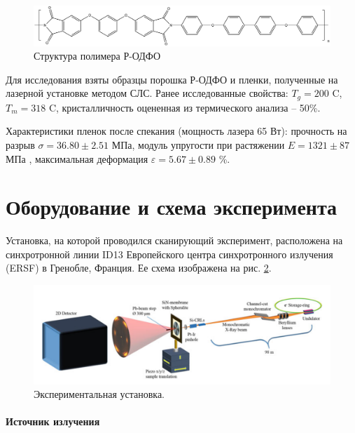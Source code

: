		
	\begin{figure}[h]
	\includegraphics[width=\textwidth]{fig/formula.png}
	\caption{Структура полимера Р-ОДФО \cite{pi-formula}}
	\label{fig:formula}
	\end{figure}

Для исследования взяты образцы порошка Р-ОДФО и пленки, полученные на лазерной установке методом СЛС. Ранее исследованные свойства\cite{vaganov}:
 $T_g = 200$ \textdegree C, $T_m = 318$ \textdegree C, кристалличность оцененная из термического анализа -- 50\%.

Характеристики пленок после спекания (мощность лазера 65 Вт):
прочность на разрыв $ \sigma =36.80 \pm 2.51$ МПа, модуль упругости при растяжении   $ E = 1321 \pm 87$ МПа , максимальная деформация $ \varepsilon = 5.67  \pm 0.89$ \%. 


\section{Оборудование и схема эксперимента}
Установка, на которой проводился сканирующий эксперимент, расположена на синхротронной линии ID13 Европейского центра синхротронного излучения (ERSF) в Гренобле, Франция. Ее схема  изображена на рис. \ref{fig:experiment}. 

\begin{figure}[h]
    \centering
    \includegraphics[width=\linewidth]{fig/ust.PNG}
    \caption{Экспериментальная установка. \cite{experiment}}
    \label{fig:experiment}
\end{figure}

\paragraph{Источник излучения}

